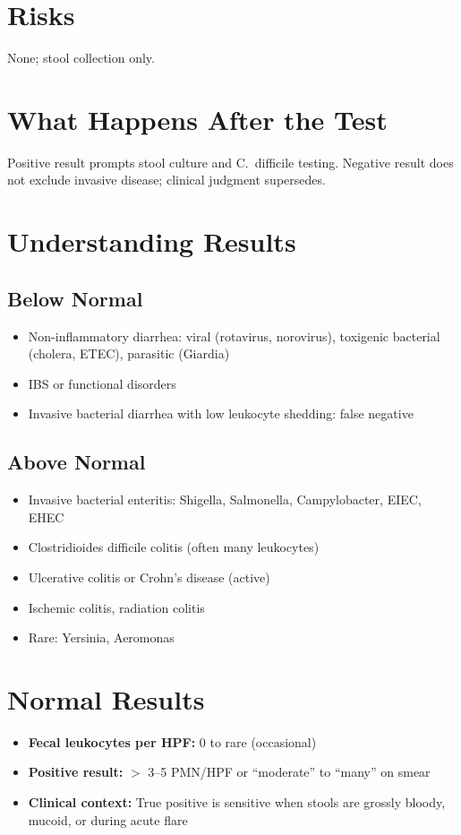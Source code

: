 \section*{Risks}
None; stool collection only.

\section*{What Happens After the Test}
Positive result prompts stool culture and C.\ difficile testing. Negative result does not exclude invasive disease; clinical judgment supersedes.

\section*{Understanding Results}

\subsection*{Below Normal}
\begin{itemize}
  \item Non-inflammatory diarrhea: viral (rotavirus, norovirus), toxigenic bacterial (cholera, ETEC), parasitic (Giardia)
  \item IBS or functional disorders
  \item Invasive bacterial diarrhea with low leukocyte shedding: false negative
\end{itemize}

\subsection*{Above Normal}
\begin{itemize}
  \item Invasive bacterial enteritis: Shigella, Salmonella, Campylobacter, EIEC, EHEC
  \item Clostridioides difficile colitis (often many leukocytes)
  \item Ulcerative colitis or Crohn's disease (active)
  \item Ischemic colitis, radiation colitis
  \item Rare: Yersinia, Aeromonas
\end{itemize}

\section*{Normal Results}
\begin{itemize}
  \item \textbf{Fecal leukocytes per HPF:} 0 to rare (occasional)
  \item \textbf{Positive result:} $>$ 3--5 PMN/HPF or ``moderate'' to ``many'' on smear
  \item \textbf{Clinical context:} True positive is sensitive when stools are grossly bloody, mucoid, or during acute flare
\end{itemize}

